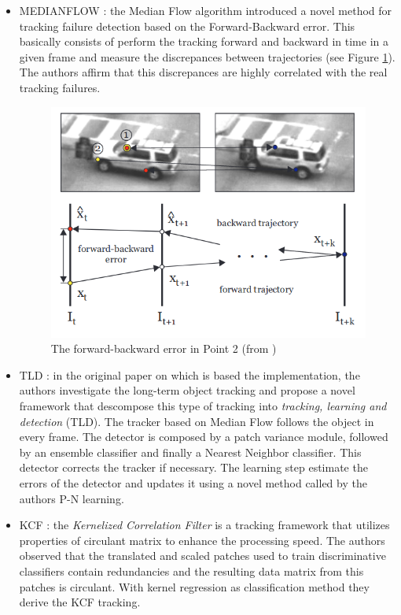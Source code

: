 \begin{itemize}
\item MEDIANFLOW \cite{kalal2010forward}: the Median Flow algorithm introduced a novel method for tracking failure detection based on the Forward-Backward error. This  basically consists of perform the tracking forward and backward in time in a given frame and measure the discrepances between trajectories (see Figure \ref{fig:medianflow}). The authors affirm that this discrepances are highly correlated with the real tracking failures.
\begin{figure}[h!]
\begin{center}
\includegraphics[scale=0.4]{figures/medianflow.png}
\caption{The forward-backward error in Point 2 (from \cite{kalal2010forward})}
\label{fig:medianflow}
\end{center}
\end{figure}    
\item TLD \cite{kalal2011tracking}: in the original paper on which is based the implementation, the authors investigate the long-term object tracking and propose a novel framework that descompose this type of tracking into \textit{tracking, learning and detection} (TLD). The tracker based on Median Flow follows the object in every frame. The detector is composed by a patch variance module, followed by an ensemble classifier and finally a Nearest Neighbor classifier. This detector corrects the tracker if necessary. The learning step estimate the errors of the detector and updates it using a novel method called by the authors P-N learning.
\item KCF \cite{henriques2012exploiting}: the \textit{Kernelized Correlation Filter} is a tracking framework that utilizes properties of circulant matrix to enhance the processing speed. The authors observed that the translated and scaled patches used to train discriminative classifiers contain redundancies and the resulting data matrix from this patches is circulant. With kernel regression as classification method they derive the KCF tracking.

\end{itemize}
